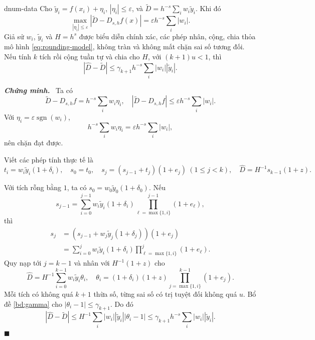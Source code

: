 \documentclass[12pt,a4paper,oneside]{book}
\numberwithin{algorithm}{chapter}
\theoremstyle{definition}
\newenvironment{chungminh}{\par\medskip\noindent\textbf{\textit{\color{mainblue}Chứng minh.}}\ }{\hfill$\blacksquare$\par\medskip}
\begin{document}
\begin{menhde}{}{dnum-data}
Cho $\widetilde y_i=f(x_i)+\eta_i$, $|\eta_i|\leq\varepsilon$, và $\widetilde D=h^{-s}\sum_iw_i\widetilde y_i$. Khi đó
\[
 \max_{|\eta_i|\leq\varepsilon}|\widetilde D-D_{s,h}f(x)|
 =\varepsilon h^{-s}\sum_i|w_i|.
\]
Giả sử $w_i$, $\widetilde y_i$ và $H=h^s$ được biểu diễn chính xác, các phép nhân, cộng, chia thỏa mô hình \eqref{eq:rounding-model}, không tràn và không mất chặn sai số tương đối. Nếu tính $k$ tích rồi cộng tuần tự và chia cho $H$, với $(k+1)u<1$, thì
\[
 |\widehat D-\widetilde D|\leq\gamma_{k+1}h^{-s}\sum_i|w_i||\widetilde y_i|.
\]
\end{menhde}
\begin{chungminh}
Ta có
\[
 \widetilde D-D_{s,h}f=h^{-s}\sum_iw_i\eta_i,
 \quad |\widetilde D-D_{s,h}f|\leq\varepsilon h^{-s}\sum_i|w_i|.
\]
Với $\eta_i=\varepsilon\operatorname{sgn}(w_i)$,
\[
 h^{-s}\sum_iw_i\eta_i=\varepsilon h^{-s}\sum_i|w_i|,
\]
nên chặn đạt được.

Viết các phép tính thực tế là
\[
 t_i=w_i\widetilde y_i(1+\delta_i),\quad s_0=t_0,\quad
 s_j=(s_{j-1}+t_j)(1+e_j)\ (1\leq j<k),\quad
 \widehat D=H^{-1}s_{k-1}(1+z).
\]

Với tích rỗng bằng $1$, ta có $s_0=w_0\widetilde y_0(1+\delta_0)$. Nếu
\[
 s_{j-1}=\sum_{i=0}^{j-1}w_i\widetilde y_i(1+\delta_i)
 \prod_{\ell=\max\{1,i\}}^{j-1}(1+e_\ell),
\]
thì
\begin{align*}
 s_j&=(s_{j-1}+w_j\widetilde y_j(1+\delta_j))(1+e_j)\\
 &=\sum_{i=0}^jw_i\widetilde y_i(1+\delta_i)
 \prod_{\ell=\max\{1,i\}}^j(1+e_\ell).
\end{align*}
Quy nạp tới $j=k-1$ và nhân với $H^{-1}(1+z)$ cho
\[
 \widehat D=H^{-1}\sum_{i=0}^{k-1}w_i\widetilde y_i\theta_i,
\quad
 \theta_i=(1+\delta_i)(1+z)\prod_{j=\max\{1,i\}}^{k-1}(1+e_j).
\]
Mỗi tích có không quá $k+1$ thừa số, từng sai số có trị tuyệt đối không quá $u$. Bổ đề \ref{bd:gamma} cho $|\theta_i-1|\leq\gamma_{k+1}$. Do đó
\[
 |\widehat D-\widetilde D|\leq H^{-1}\sum_i|w_i||\widetilde y_i||\theta_i-1|
 \leq\gamma_{k+1}h^{-s}\sum_i|w_i||\widetilde y_i|.
\]
\end{chungminh}
\end{document}
